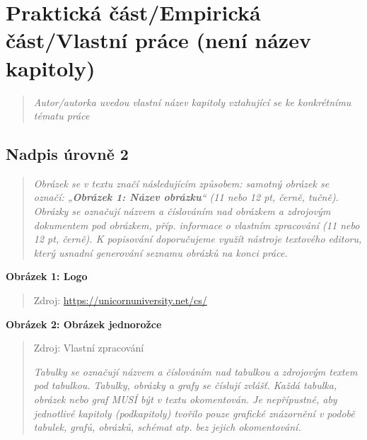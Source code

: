 \documentclass[
]{article}
\begin{document}
\newpage
\hypertarget{praktickuxe1-ux10duxe1stempirickuxe1-ux10duxe1stvlastnuxed-pruxe1ce-nenuxed-nuxe1zev-kapitoly}{%
  \section{Praktická část/Empirická část/Vlastní práce (není název
    kapitoly)}\label{praktickuxe1-ux10duxe1stempirickuxe1-ux10duxe1stvlastnuxed-pruxe1ce-nenuxed-nuxe1zev-kapitoly}}

\begin{quote}
  \emph{Autor/autorka uvedou vlastní název kapitoly vztahující se ke
    konkrétnímu tématu práce}
\end{quote}

\hypertarget{nadpis-uxfarovnux11b-2-2}{%
  \subsection{Nadpis úrovně 2}\label{nadpis-uxfarovnux11b-2-2}}

\begin{quote}
  \emph{Obrázek se v textu značí následujícím způsobem: samotný obrázek se
    označí: „\textbf{Obrázek 1: Název obrázku}`` (11 nebo 12 pt, černě,
    tučně). Obrázky se označují názvem a číslováním nad obrázkem a zdrojovým
    dokumentem pod obrázkem, příp. informace o vlastním zpracování (11 nebo
    12 pt, černě). K popisování doporučujeme využít nástroje textového
    editoru, který usnadní generování seznamu obrázků na konci práce.}
\end{quote}

\textbf{Obrázek 1: Logo}


\begin{quote}
  Zdroj: \url{https://unicornuniversity.net/cs/}
\end{quote}

\newpage
\textbf{Obrázek 2: Obrázek jednorožce}

\begin{quote}

  Zdroj: Vlastní zpracování

  \emph{Tabulky se označují názvem a číslováním nad tabulkou a zdrojovým
    textem pod tabulkou. Tabulky, obrázky a grafy se číslují zvlášť. Každá
    tabulka, obrázek nebo graf MUSÍ být v textu okomentován. Je nepřípustné,
    aby jednotlivé kapitoly (podkapitoly) tvořilo pouze grafické znázornění
    v podobě tabulek, grafů, obrázků, schémat atp. bez jejich okomentování.}
\end{quote}
\end{document}
